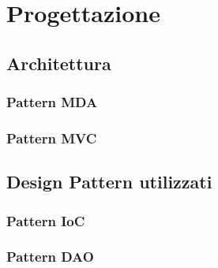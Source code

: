 \chapter{Progettazione}
\label{cap:progettazione}


\setlength{\parskip}{3ex}

\section{Architettura}
\subsection{Pattern MDA}


\subsection{Pattern MVC}


\section{Design Pattern utilizzati}
\subsection{Pattern IoC}


\subsection{Pattern DAO}
